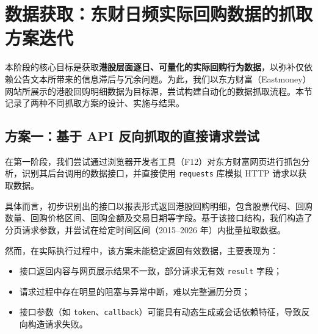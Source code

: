 \documentclass[a4paper,10pt]{article}
\begin{document}

\section{数据获取：东财日频实际回购数据的抓取方案迭代}

本阶段的核心目标是获取\textbf{港股层面逐日、可量化的实际回购行为数据}，以弥补仅依赖公告文本所带来的信息滞后与冗余问题。为此，我们以东方财富（Eastmoney）网站所展示的港股回购明细数据为目标源，尝试构建自动化的数据抓取流程。本节记录了两种不同抓取方案的设计、实施与结果。

\subsection{方案一：基于 API 反向抓取的直接请求尝试}

在第一阶段，我们尝试通过浏览器开发者工具（F12）对东方财富网页进行抓包分析，识别其后台调用的数据接口，并直接使用 \texttt{requests} 库模拟 HTTP 请求以获取数据。

具体而言，初步识别出的接口以报表形式返回港股回购明细，包含股票代码、回购数量、回购价格区间、回购金额及交易日期等字段。基于该接口结构，我们构造了分页请求参数，并尝试在给定时间区间（2015--2026 年）内批量拉取数据。

然而，在实际执行过程中，该方案未能稳定返回有效数据，主要表现为：
\begin{itemize}
    \item 接口返回内容与网页展示结果不一致，部分请求无有效 \texttt{result} 字段；
    \item 请求过程中存在明显的阻塞与异常中断，难以完整遍历分页；
    \item 接口参数（如 \texttt{token}、\texttt{callback}）可能具有动态生成或会话依赖特征，导致反向构造请求失败。
\end{itemize}
\end{document}
